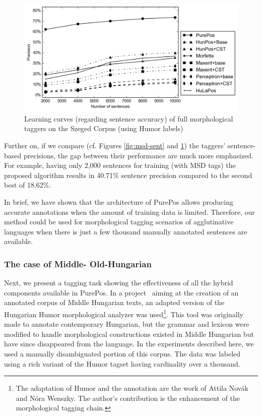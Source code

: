 \begin{figure}[H]
  \centering
  \includegraphics[width=1\textwidth]{MorphTagging/humor_sent.png}
  \caption{Learning curves (regarding sentence accuracy) of full morphological taggers on the Szeged Corpus (using Humor labels)}
  \label{fig:humor-sent}
\end{figure}

Further on, if we compare (cf. Figures \ref{fig:msd-sent} and \ref{fig:humor-sent}) the taggers' sentence-based precisions, the gap between their performance are much more emphasized. 
For example, having only 2,000 sentences for training (with MSD tags) the proposed algorithm results in 40.71\% sentence precision compared to the second best of 18.62\%.

In brief, we have shown that the architecture of PurePos allows producing accurate annotations when the amount of training data is limited. Therefore, our method could be used for morphological tagging scenarios of agglutinative languages when there is just a few thousand manually annotated sentences are available.

\subsubsection{The case of Middle- Old-Hungarian}
\label{sec:oldhungarian}

Next, we present a tagging task showing the effectiveness of all the hybrid components available in PurePos. 
In a project~\cite{NovakOMK,Novak2013} aiming at the creation of an annotated corpus of Middle Hungarian texts, an adapted version of the Hungarian Humor morphological analyzer \cite{NovakOMK} was used\footnote{The adaptation of Humor and the annotation are the work of Attila Novák and Nóra Wenszky. The author's contribution is the enhancement of the morphological tagging chain.}. 
This tool was originally made to annotate contemporary Hungarian, but the grammar and lexicon were modified to handle morphological constructions existed in Middle Hungarian but have since disappeared from the language. 
In the experiments described here, we used a manually disambiguated portion of this corpus. The data was labeled using a rich variant of the Humor tagset having cardinality over a thousand.

